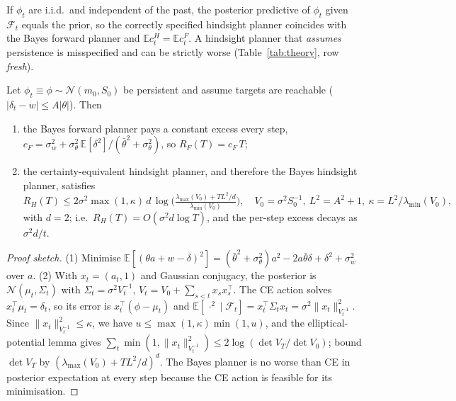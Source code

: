 \begin{theorem}\label{thm:fresh}
If $\phi_t$ are i.i.d.\ and independent of the past, the posterior predictive of $\phi_t$ given $\mathcal F_t$ equals
the prior, so the correctly specified hindsight planner coincides with the Bayes forward planner and
$\mathbb E c^H_t=\mathbb E c^F_t$. A hindsight planner that \emph{assumes} persistence is misspecified and can be
strictly worse (Table~\ref{tab:theory}, row \emph{fresh}).
\end{theorem}

\begin{theorem}\label{thm:separation}
Let $\phi_t\equiv\phi\sim\mathcal N(m_0,S_0)$ be persistent and assume targets are reachable
($|\delta_t-w|\le A|\theta|$). Then
\begin{enumerate}
\item the Bayes forward planner pays a constant excess every step,
  $c_F=\sigma_w^2+\sigma_\theta^2\,\mathbb E[\delta^2]/(\bar\theta^2+\sigma_\theta^2)$, so $R_F(T)=c_F\,T$;
\item the certainty-equivalent hindsight planner, and therefore the Bayes hindsight planner, satisfies
\begin{equation}
R_H(T)\le 2\sigma^2\max(1,\kappa)\,d\,\log\!\Big(\tfrac{\lambda_{\max}(V_0)+TL^2/d}{\lambda_{\min}(V_0)}\Big),\quad
V_0=\sigma^2S_0^{-1},\ L^2=A^2+1,\ \kappa=L^2/\lambda_{\min}(V_0),
\end{equation}
with $d=2$; i.e.\ $R_H(T)=O(\sigma^2 d\log T)$, and the per-step excess decays as $\sigma^2 d/t$.
\end{enumerate}
\end{theorem}
\begin{proof}[Proof sketch]
(1) Minimise $\mathbb E[(\theta a+w-\delta)^2]=(\bar\theta^2+\sigma_\theta^2)a^2-2a\bar\theta\delta+\delta^2+\sigma_w^2$
over $a$. (2) With $x_t=(a_t,1)$ and Gaussian conjugacy, the posterior is $\mathcal N(\mu_t,\Sigma_t)$ with
$\Sigma_t=\sigma^2V_t^{-1}$, $V_t=V_0+\sum_{s<t}x_sx_s^\top$. The CE action solves $x_t^\top\mu_t=\delta_t$, so its
error is $x_t^\top(\phi-\mu_t)$ and $\mathbb E[\,\cdot^2\mid\mathcal F_t]=x_t^\top\Sigma_tx_t=\sigma^2\|x_t\|^2_{V_t^{-1}}$.
Since $\|x_t\|^2_{V_t^{-1}}\le\kappa$, we have $u\le\max(1,\kappa)\min(1,u)$, and the elliptical-potential lemma
\citep[Lemma 11]{abbasi2011} gives $\sum_t\min(1,\|x_t\|^2_{V_{t}^{-1}})\le2\log(\det V_T/\det V_0)$; bound
$\det V_T$ by $(\lambda_{\max}(V_0)+TL^2/d)^d$. The Bayes planner is no worse than CE in posterior expectation at
every step because the CE action is feasible for its minimisation.
\end{proof}

